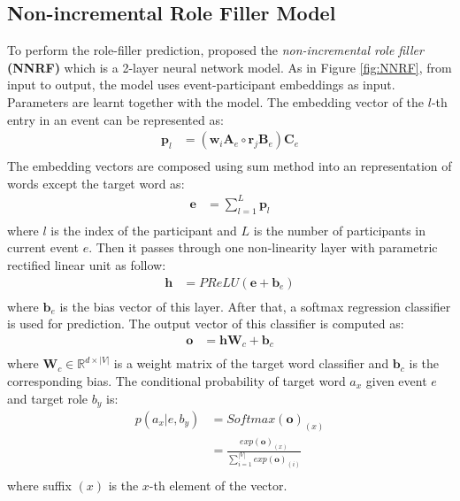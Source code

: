 \documentclass[a4paper]{article}
\begin{document}
\subsection{Non-incremental Role Filler Model} \label{sec:nnrf}
To perform the role-filler prediction, \citet{tilk2016event} proposed the \textit{non-incremental role filler} \textbf{(NNRF)} which is a 2-layer neural network model. As in Figure \ref{fig:NNRF}, from input to output, the model uses event-participant embeddings as input. Parameters are learnt together with the model. The embedding vector of the $l$-th entry in an event can be represented as:
\begin{equation} \label{eq:rbe-nnrf}
\begin{aligned}
    \mathbf{p}_l
        &= (\mathbf{w}_i \mathbf{A}_e \circ \mathbf{r}_j \mathbf{B}_e) \mathbf{C}_e \\
\end{aligned}
\end{equation}
The embedding vectors are composed using sum method into an representation of words except the target word as:
\begin{equation} \label{eq:sum-comp}
\begin{aligned}
    \mathbf{e}
        &= \sum_{l=1}^{L} \mathbf{p}_{l} \\
\end{aligned}
\end{equation}
where $l$ is the index of the participant and $L$ is the number of participants in current event $e$. Then it passes through one non-linearity layer with parametric rectified linear unit \citep{he2015delving} as follow:
\begin{equation} \label{eq:nonlinearity-nnrf}
\begin{aligned}
    \mathbf{h}
        &= PReLU(\mathbf{e} + \mathbf{b}_e) \\
\end{aligned}
\end{equation}
where $\mathbf{b}_e$ is the bias vector of this layer. After that, a softmax regression classifier is used for prediction. The output vector of this classifier is computed as:
\begin{equation} \label{eq:output-nnrf}
\begin{aligned}
    \mathbf{o}
        &= \mathbf{h}\mathbf{W}_c + \mathbf{b}_c \\
\end{aligned}
\end{equation}
where $\mathbf{W}_c\in \mathbb{R}^{d \times |V|}$ is a weight matrix of the target word classifier and $\mathbf{b}_c$ is the corresponding bias. The conditional probability of target word $a_x$ given event $e$ and target role $b_y$ is:
\begin{equation} \label{eq:softmax-nnrf}
\begin{aligned}
    p(a_x | e, b_y)
        &= Softmax(\mathbf{o})_{(x)} \\
        &= \frac{
        exp(\mathbf{o})_{(x)}
        }{
        \sum_{i=1}^{|V|} exp(\mathbf{o})_{(i)} }   \\
\end{aligned}
\end{equation}
where suffix $(x)$ is the $x$-th element of the vector. 
\end{document}
